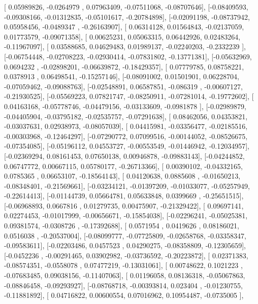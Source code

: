 \documentclass{article}
\begin{document}
       [ 0.05989826, -0.0264979 ,  0.07963409, -0.07511068, -0.08707646],
       [-0.08409593, -0.09308166, -0.01312835, -0.05101617, -0.20784898],
       [-0.02091198, -0.08737942,  0.05958456, -0.0489347 , -0.26163907],
       [ 0.06314128,  0.01564843, -0.02137059,  0.01773579, -0.09071358],
       [ 0.00625231,  0.05063315,  0.06442926,  0.02483264, -0.11967097],
       [ 0.03588685,  0.04629483,  0.01989137, -0.02240203, -0.2332239 ],
       [-0.06754448, -0.02708223, -0.02930414, -0.07831802, -0.13771381],
       [-0.05632969,  0.0694232 , -0.02898201, -0.06639872, -0.18429357],
       [ 0.07779785,  0.08758221,  0.0378913 ,  0.06498541, -0.15257146],
       [-0.08091002,  0.01501901,  0.06228704, -0.07059462, -0.09088763],
       [-0.02548891,  0.06587851, -0.086319  , -0.00607127, -0.21930525],
       [-0.05569223,  0.07821747, -0.08250911, -0.07281014, -0.19772602],
       [ 0.04163168, -0.05778746, -0.04479156, -0.03133609, -0.0981878 ],
       [-0.02989879, -0.04405904, -0.03795182, -0.02535757, -0.07291638],
       [ 0.08462056,  0.04353821, -0.03037631,  0.02938973, -0.08057039],
       [ 0.04415981, -0.03356477, -0.02185516, -0.00303968, -0.12464297],
       [-0.07290772,  0.07099516, -0.00144052, -0.08526675, -0.07354085],
       [-0.05196112,  0.04553727, -0.00553549, -0.01446942, -0.12034957],
       [-0.02369294,  0.08161453,  0.07650138,  0.00946878, -0.09883143],
       [-0.04244852,  0.06747772,  0.00667115,  0.05780177, -0.26713366],
       [ 0.00390102, -0.04332165,  0.0785365 ,  0.06653107, -0.18564143],
       [ 0.04120638,  0.0885608 , -0.01650213, -0.08348401, -0.21569661],
       [-0.03234121, -0.01397209, -0.01033077, -0.05257949, -0.22614413],
       [-0.01144739,  0.05664781,  0.05633848,  0.0399669 , -0.25651515],
       [-0.06968893,  0.0667816 ,  0.01279735,  0.00475907, -0.21329422],
       [ 0.09697141,  0.02274453, -0.01017999, -0.00656671, -0.15854038],
       [-0.02296241, -0.05025381,  0.09381574, -0.0308726 , -0.17392688],
       [ 0.0571954 ,  0.0419626 ,  0.08186021,  0.0516038 , -0.20537004],
       [-0.08099777, -0.07725809, -0.02658768, -0.03358347, -0.09583611],
       [-0.02203486,  0.0457523 ,  0.04290275, -0.08358809, -0.12305659],
       [-0.0452236 , -0.00291465,  0.03902982, -0.03736592, -0.20223872],
       [ 0.02371383, -0.08574351, -0.0558078 ,  0.07477219, -0.13031061],
       [ 0.00748622,  0.1021223 , -0.07683485,  0.09038156, -0.11407063],
       [ 0.01196058,  0.08136318, -0.05067863, -0.08846458, -0.09293927],
       [-0.08768718, -0.00393814,  0.023404  , -0.01230755, -0.11881892],
       [ 0.04716822,  0.00600554,  0.07016962,  0.10954487, -0.0735005 ],
\end{document}

